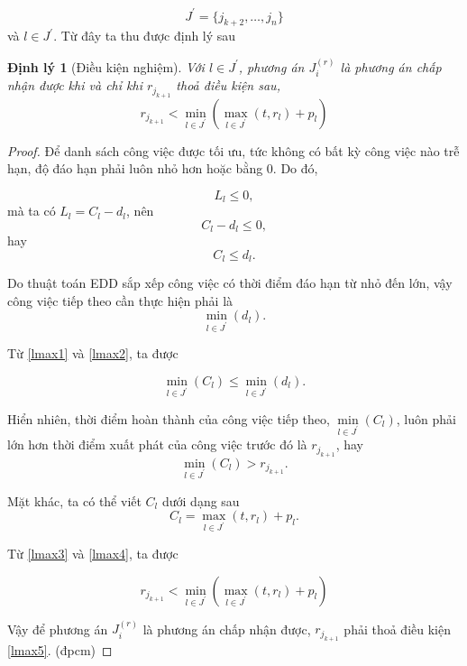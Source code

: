 \documentclass[12pt,a4paper]{report}
\newtheorem{dl}{Định lý}
\begin{document}
\begin{equation*}
J^{'} = \{j_{k+2},\ldots , j_{n}\}
\end{equation*}
và $l \in J^{'}$. Từ đây ta thu được định lý sau

\begin{dl}[Điều kiện nghiệm]
	Với $l \in J^{'}$, phương án $J_i^{(r)}$ là phương án chấp nhận được khi và chỉ khi $r_{j_{k+1}}$ thoả điều kiện sau,
	\begin{equation} \label{dllmax1}
		r_{j_{k+1}} < \underset{l \in J^{'}}{\min} (\underset{l \in J^{'}}{\max} (t, r_l) + p_l)
	\end{equation}
\end{dl}

\begin{proof}

\phantom{}

Để danh sách công việc được tối ưu, tức không có bất kỳ công việc nào trễ hạn, độ đáo hạn phải luôn nhỏ hơn hoặc bằng 0. Do đó,

\begin{equation*}
	L_l \leq 0,
\end{equation*}
mà ta có $L_l = C_l - d_l$, nên
\begin{equation*}
	C_l - d_l \leq 0,
\end{equation*}
hay
\begin{equation} \label{lmax1}
	C_l \leq d_l.
\end{equation}

Do thuật toán EDD sắp xếp công việc có thời điểm đáo hạn từ nhỏ đến lớn, vậy công việc tiếp theo cần thực hiện phải là 
\begin{equation} \label{lmax2}
\underset{l \in J^{'}}{\min} (d_l).
\end{equation}

Từ \eqref{lmax1} và \eqref{lmax2}, ta được

\begin{equation}
	\underset{l \in J^{'}}{\min} (C_l) \leq \underset{l \in J^{'}}{\min} (d_l).
\end{equation}

Hiển nhiên, thời điểm hoàn thành của công việc tiếp theo, $\underset{l \in J^{'}}{\min}(C_l)$, luôn phải lớn hơn thời điểm xuất phát của công việc trước đó là $r_{j_{k+1}}$, hay
\begin{equation} \label{lmax3}
	\underset{l \in J^{'}}{\min} (C_l) > r_{j_{k+1}}.
\end{equation}

Mặt khác, ta có thể viết $C_l$ dưới dạng sau
\begin{equation} \label{lmax4}
	C_l = \underset{l \in J^{'}}{\max} (t, r_l) + p_l.
\end{equation}

Từ \eqref{lmax3} và \eqref{lmax4}, ta được

\begin{equation} \label{lmax5}
	r_{j_{k+1}} < \underset{l \in J^{'}}{\min} (\underset{l \in J^{'}}{\max} (t, r_l) + p_l)
\end{equation}

Vậy để phương án $J_i^{(r)}$ là phương án chấp nhận được, $r_{j_{k+1}}$ phải thoả điều kiện \eqref{lmax5}. (đpcm)
\end{proof}
\end{document}
